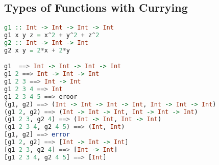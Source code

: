 \hypertarget{types-of-functions-with-currying}{%
\subsection{Types of Functions with
Currying}\label{types-of-functions-with-currying}}

\begin{lstlisting}[language=Haskell]
g1 :: Int -> Int -> Int -> Int
g1 x y z = x^2 + y^2 + z^2
g2 :: Int -> Int -> Int
g2 x y = 2*x + 2*y

g1  ==> Int -> Int -> Int -> Int
g1 2 ==> Int -> Int -> Int
g1 2 3 ==> Int -> Int
g1 2 3 4 ==> Int
g1 2 3 4 5 ==> eroor
(g1, g2) ==> (Int -> Int -> Int -> Int, Int -> Int -> Int)
(g1 2, g2) ==> (Int -> Int -> Int, Int -> Int -> Int)
(g1 2 3, g2 4) ==> (Int -> Int, Int -> Int)
(g1 2 3 4, g2 4 5) ==> (Int, Int)
[g1, g2] ==> error
[g1 2, g2] ==> [Int -> Int -> Int]
[g1 2 3, g2 4] ==> [Int -> Int]
[g1 2 3 4, g2 4 5] ==> [Int]
\end{lstlisting}

\clearpage